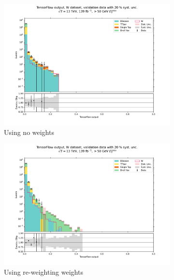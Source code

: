 \documentclass[12pt, a4paper]{book}
\begin{document}
\begin{figure}[!ht]
	\centering
	\begin{subfigure}[b]{0.49\textwidth}
         \centering
         \includegraphics[width=1\textwidth]{Unweighted/VAL.pdf}
         \caption{Using no weights}\label{fig:WVALUW}
      \end{subfigure}
      \hfill
      \begin{subfigure}[b]{0.49\textwidth}
         \centering
         \includegraphics[width=1\textwidth]{Weighted/VAL.pdf}
         \caption{Using re-weighting weights}\label{fig:WVALMC}
      \end{subfigure}
      \begin{subfigure}[b]{0.49\textwidth}
         \centering

\end{subfigure}
\end{figure}
\end{document}
